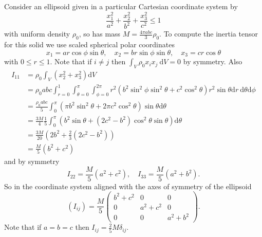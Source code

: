 \begin{example}
    Consider an ellipsoid given in a particular Cartesian coordinate system by
    \[
    \frac{x_{1}^{2}}{a^{2}}+\frac{x_{2}^{2}}{b^{2}}+\frac{x_{3}^{2}}{c^{2}} \le 1
    \]
    with uniform density $\rho_{0}$, so has mass $M=\frac{4 \pi a b c}{3} \rho_{0} .$ To compute the inertia tensor for this solid we use scaled spherical polar coordinates
    \[
    x_{1}=a r \cos \phi \sin \theta, \quad x_{2}=b r \sin \phi \sin \theta, \quad x_{3}=c r \cos \theta
    \]
    with $0 \le r \le 1$. Note that if $i \neq j$ then $ \int_{V} \rho_{0} x_{i} x_{j} \mathrm{~d} V=0 $ by symmetry. Also
    \[
    \begin{aligned}
    I_{11} &=\rho_{0} \int_{V}\left(x_{2}^{2}+x_{3}^{2}\right) \mathrm{d} V \\
    &=\rho_{0} a b c \int_{r=0}^{1} \int_{\theta=0}^{\pi} \int_{\phi=0}^{2 \pi} r^{2}\left(b^{2} \sin ^{2} \phi \sin ^{2} \theta+c^{2} \cos ^{2} \theta\right) r^{2} \sin \theta \mathrm{d} r \mathrm{~d} \theta \mathrm{d} \phi \\
    &=\frac{\rho_{0} a b c}{5} \int_{0}^{\pi}\left(\pi b^{2} \sin ^{2} \theta+2 \pi c^{2} \cos ^{2} \theta\right) \sin \theta \mathrm{d} \theta \\
    &=\frac{3 M}{4} \frac{1}{5} \int_{0}^{\pi}\left(b^{2} \sin \theta+\left(2 c^{2}-b^{2}\right) \cos ^{2} \theta \sin \theta\right) \mathrm{d} \theta \\
    &=\frac{3 M}{20}\left(2 b^{2}+\frac{2}{3}\left(2 c^{2}-b^{2}\right)\right) \\
    &=\frac{M}{5}\left(b^{2}+c^{2}\right)
    \end{aligned}
    \]
    and by symmetry
    \[
    I_{22}=\frac{M}{5}\left(a^{2}+c^{2}\right), \quad I_{33}=\frac{M}{5}\left(a^{2}+b^{2}\right).
    \]
    So in the coordinate system aligned with the axes of symmetry of the ellipsoid
    \[
    \left(I_{i j}\right)=\frac{M}{5}\begin{pmatrix}
        b^{2}+c^{2} & 0 & 0 \\
    0 & a^{2}+c^{2} & 0 \\
    0 & 0 & a^{2}+b^{2}
    \end{pmatrix}.
    \]
    Note that if $a=b=c$ then $I_{i j}=\frac{2}{5} M \delta_{i j}$.
\end{example}

